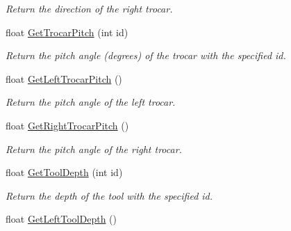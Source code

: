 \begin{DoxyCompactItemize}
\begin{DoxyCompactList}\small\item\em Return the direction of the right trocar. \item\end{DoxyCompactList}\item 
\hypertarget{classvtkIHP_a186c478c7dc653e3a99ab1573c4e44b0}{
float \hyperlink{classvtkIHP_a186c478c7dc653e3a99ab1573c4e44b0}{GetTrocarPitch} (int id)}
\label{classvtkIHP_a186c478c7dc653e3a99ab1573c4e44b0}

\begin{DoxyCompactList}\small\item\em Return the pitch angle (degrees) of the trocar with the specified id. \item\end{DoxyCompactList}\item 
\hypertarget{classvtkIHP_ab3d0c4abab29636780dbd41c94b96992}{
float \hyperlink{classvtkIHP_ab3d0c4abab29636780dbd41c94b96992}{GetLeftTrocarPitch} ()}
\label{classvtkIHP_ab3d0c4abab29636780dbd41c94b96992}

\begin{DoxyCompactList}\small\item\em Return the pitch angle of the left trocar. \item\end{DoxyCompactList}\item 
\hypertarget{classvtkIHP_aa1d8a3f66a09a179d43bfa0c685f3c58}{
float \hyperlink{classvtkIHP_aa1d8a3f66a09a179d43bfa0c685f3c58}{GetRightTrocarPitch} ()}
\label{classvtkIHP_aa1d8a3f66a09a179d43bfa0c685f3c58}

\begin{DoxyCompactList}\small\item\em Return the pitch angle of the right trocar. \item\end{DoxyCompactList}\item 
\hypertarget{classvtkIHP_a343a91efbbf70eeb07b0715d3dc75877}{
float \hyperlink{classvtkIHP_a343a91efbbf70eeb07b0715d3dc75877}{GetToolDepth} (int id)}
\label{classvtkIHP_a343a91efbbf70eeb07b0715d3dc75877}

\begin{DoxyCompactList}\small\item\em Return the depth of the tool with the specified id. \item\end{DoxyCompactList}\item 
\hypertarget{classvtkIHP_aa086fedb70ad3c6cd95b38bdbd54c309}{
float \hyperlink{classvtkIHP_aa086fedb70ad3c6cd95b38bdbd54c309}{GetLeftToolDepth} ()}
\label{classvtkIHP_aa086fedb70ad3c6cd95b38bdbd54c309}


\end{DoxyCompactItemize}
